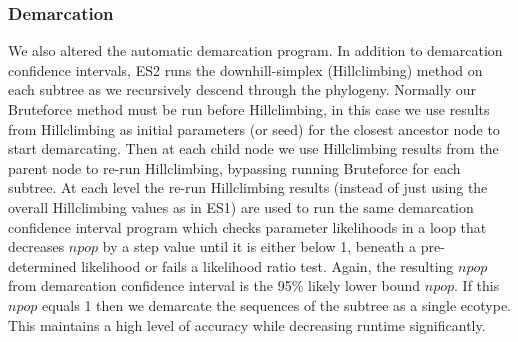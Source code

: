 \subsubsection*{Demarcation}
We also altered the automatic demarcation program.
In addition to demarcation confidence intervals, ES2 runs the downhill-simplex (Hillclimbing) method on each subtree as we recursively descend through the phylogeny.
Normally our Bruteforce method must be run before Hillclimbing, in this case we use results from Hillclimbing as initial parameters (or seed) for the closest ancestor node to start demarcating.
Then at each child node we use Hillclimbing results from the parent node to re-run Hillclimbing, bypassing running Bruteforce for each subtree.
At each level the re-run Hillclimbing results (instead of just using the overall Hillclimbing values as in ES1) are used to run the same demarcation confidence interval program which checks parameter likelihoods in a loop that decreases $npop$ by a step value until it is either below 1, beneath a pre-determined likelihood or fails a likelihood ratio test.
Again, the resulting $npop$ from demarcation confidence interval is the 95\% likely lower bound $npop$.
If this $npop$ equals 1 then we demarcate the sequences of the subtree as a single ecotype.
This maintains a high level of accuracy while decreasing runtime significantly.

